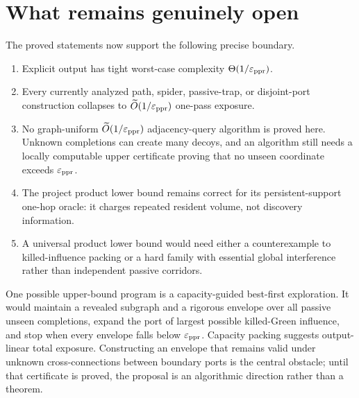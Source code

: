 \section{What remains genuinely open}
\label{sec:information-open}

The proved statements now support the following precise boundary.

\begin{enumerate}
\item Explicit output has tight worst-case complexity
      $\Theta(1/\varepsilon_{\mathrm{ppr}})$.
\item Every currently analyzed path, spider, passive-trap, or disjoint-port
      construction collapses to $\widetilde O(1/\varepsilon_{\mathrm{ppr}})$ one-pass exposure.
\item No graph-uniform $\widetilde O(1/\varepsilon_{\mathrm{ppr}})$ adjacency-query algorithm is
      proved here.  Unknown completions can create many decoys, and an
      algorithm still needs a locally computable upper certificate proving
      that no unseen coordinate exceeds $\varepsilon_{\mathrm{ppr}}$.
\item The project product lower bound remains correct for its
      persistent-support one-hop oracle: it charges repeated resident volume,
      not discovery information.
\item A universal product lower bound would need either a counterexample to
      killed-influence packing or a hard family with essential global
      interference rather than independent passive corridors.
\end{enumerate}

One possible upper-bound program is a capacity-guided best-first exploration.
It would maintain a revealed subgraph and a rigorous envelope over all passive
unseen completions, expand the port of largest possible killed-Green
influence, and stop when every envelope falls below $\varepsilon_{\mathrm{ppr}}$.  Capacity
packing suggests output-linear total exposure.  Constructing an envelope
that remains valid under unknown cross-connections between boundary ports is
the central obstacle; until that certificate is proved, the proposal is an
algorithmic direction rather than a theorem.
